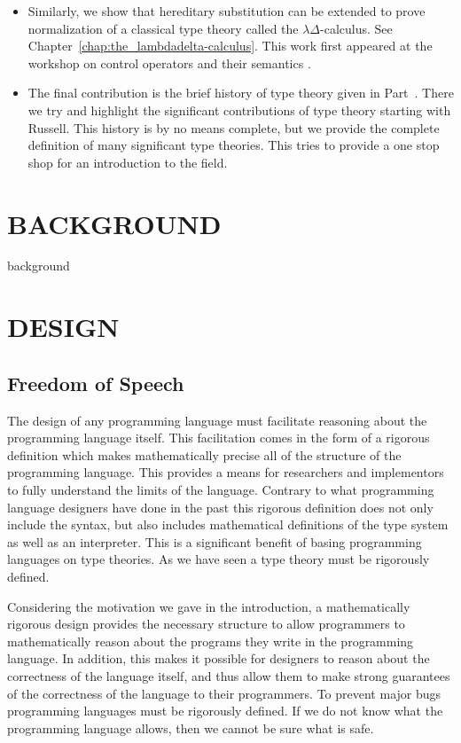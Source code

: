 \documentclass[phd,appendix,dedicationpage,ackpage,epigraphpage,figures]{uithesis}
\begin{document}
\begin{itemize}
\item Similarly, we show that hereditary substitution can be extended
  to prove normalization of a classical type theory called the
  $\lambda\Delta$-calculus. See
  Chapter~\ref{chap:the_lambdadelta-calculus}.  This work first
  appeared at the workshop on control operators and their semantics
  \cite{Eades:2013}.

\item The final contribution is the brief history of type theory given
  in Part~\ref{part:background}.  There we try and highlight the
  significant contributions of type theory starting with Russell.
  This history is by no means complete, but we provide the complete
  definition of many significant type theories.  This tries to provide
  a one stop shop for an introduction to the field.
\end{itemize}

\part{BACKGROUND}          
\label{part:background}
{background}

\part{DESIGN}
\label{part:design}

\chapter{Freedom of Speech}
\label{chap:freedom_of_speech}
The design of any programming language must facilitate reasoning about
the programming language itself.  This facilitation comes in the form
of a rigorous definition which makes mathematically precise all of the
structure of the programming language.  This provides a means for
researchers and implementors to fully understand the limits of the
language.  Contrary to what programming language designers have done
in the past this rigorous definition does not only include the syntax,
but also includes mathematical definitions of the type system as well
as an interpreter. This is a significant benefit of basing programming
languages on type theories.  As we have seen a type theory must be
rigorously defined.  

Considering the motivation we gave in the introduction, a
mathematically rigorous design provides the necessary structure to
allow programmers to mathematically reason about the programs they
write in the programming language.  In addition, this makes it
possible for designers to reason about the correctness of the language
itself, and thus allow them to make strong guarantees of the
correctness of the language to their programmers.  To prevent major
bugs programming languages must be rigorously defined.  If we do not
know what the programming language allows, then we cannot be sure what
is safe.
\end{document}
